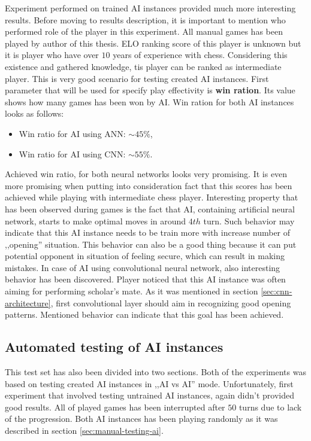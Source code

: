 Experiment performed on trained AI instances provided much more interesting results. Before moving to results description, it is important to mention who performed role of the player in this experiment. All manual games has been played by author of this thesis. ELO ranking score of this player is unknown but it is player who have over $10$ years of experience with chess. Considering this existence and gathered knowledge, tis player can be ranked as intermediate player. This is very good scenario for testing created AI instances. First parameter that will be used for specify play effectivity is \textbf{win ration}. Its value shows how many games has been won by AI. Win ration for both AI instances looks as follows:
\begin{itemize}
    \item Win ratio for AI using ANN: $\sim 45\%$,
    \item Win ratio for AI using CNN: $\sim 55\%$.
\end{itemize}
Achieved win ratio, for both neural networks looks very promising. It is even more promising when putting into consideration fact that this scores has been achieved while playing with intermediate chess player. Interesting property that has been observed during games is the fact that AI, containing artificial neural network, starts to make optimal moves in around $4th$ turn. Such behavior may indicate that this AI instance needs to be train more with increase number of ,,opening'' situation. This behavior can also be a good thing because it can put potential opponent in situation of feeling secure, which can result in making mistakes. In case of AI using convolutional neural network, also interesting behavior has been discovered. Player noticed that this AI instance was often aiming for performing scholar's mate. As it was mentioned in section \ref{sec:cnn-architecture}, first convolutional layer should aim in recognizing good opening patterns. Mentioned behavior can indicate that this goal has been achieved.

\subsection{Automated testing of AI instances}
This test set has also been divided into two sections. Both of the experiments was based on testing created AI instances in ,,AI vs AI'' mode. Unfortunately, first experiment that involved testing untrained AI instances, again didn't provided good results. All of played games has been interrupted after $50$ turns due to lack of the progression. Both AI instances has been playing randomly as it was described in section \ref{sec:manual-testing-ai}.

